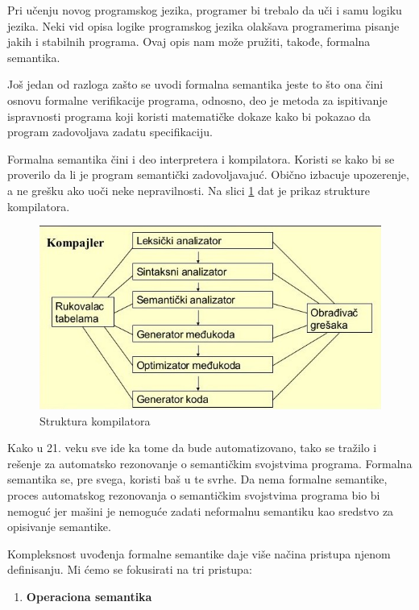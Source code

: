 \documentclass[a4paper]{article}
\begin{document}
{Pri učenju novog programskog jezika, programer bi trebalo da uči i samu logiku jezika. Neki vid opisa logike programskog jezika olakšava programerima pisanje jakih i stabilnih programa.  Ovaj opis nam može pružiti, takođe, formalna semantika.

Još jedan od razloga zašto se uvodi formalna semantika jeste to što ona čini osnovu formalne verifikacije programa, odnosno, deo je metoda za ispitivanje ispravnosti programa koji koristi matematičke dokaze kako bi pokazao da program zadovoljava zadatu specifikaciju.


Formalna semantika čini i deo interpretera i kompilatora. Koristi se kako bi se proverilo da li je program semantički zadovoljavajuć. Obično izbacuje upozerenje, a ne grešku ako uoči neke nepravilnosti. Na slici \ref{fig:kompilator} dat je prikaz strukture kompilatora.

\begin{figure}[h!]
\begin{center}
\includegraphics[scale=0.5]{kompajler.jpg}
\end{center}
\caption{Struktura kompilatora \cite{slika}}
\label{fig:kompilator}
\end{figure}

Kako u 21. veku sve ide ka tome da bude automatizovano, tako se tražilo i rešenje za automatsko rezonovanje o semantičkim svojstvima programa. Formalna semantika se,  pre svega, koristi baš u te svrhe. Da nema formalne semantike, proces automatskog rezonovanja o semantičkim svojstvima programa bio bi nemoguć jer mašini je nemoguće zadati neformalnu semantiku kao sredstvo za opisivanje semantike.


Kompleksnost uvođenja formalne semantike daje više načina pristupa njenom definisanju. Mi ćemo se fokusirati na tri pristupa:
\begin{enumerate}
  \item \textbf{Operaciona semantika}


\end{enumerate}}
\end{document}
